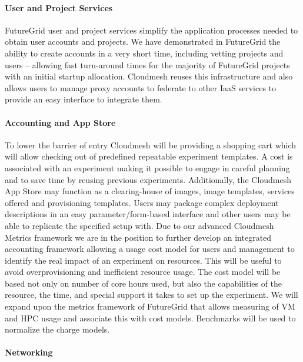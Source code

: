 \documentclass{tex/sig-alternate}
\begin{document}
\paragraph{User and Project Services}


FutureGrid user and project services simplify the application processes needed to obtain user accounts and projects. We have demonstrated in FutureGrid the ability to create accounts in a very short time, including vetting projects and users -- allowing fast turn-around times for the majority of FutureGrid projects with an initial startup allocation. Cloudmesh reuses this infrastructure and also allows users to manage proxy accounts to federate to other IaaS services to provide an easy interface to integrate them.


\paragraph{Accounting and App Store}


To lower the barrier of entry Cloudmesh will be providing a shopping cart which will allow checking out of predefined repeatable experiment templates. A cost is associated with an experiment making it possible to engage in careful planning and to save time by reusing previous experiments. Additionally, the Cloudmesh App Store may function as a clearing-house of images, image templates, services offered and provisioning templates. Users may package complex deployment descriptions in an easy parameter/form-based interface and other users may be able to replicate the specified setup with.
Due to our advanced Cloudmesh Metrics framework we are in the position to further develop an integrated accounting framework allowing a usage cost model for users and management to identify the real impact of an experiment on resources. This will be useful to avoid overprovisioning and inefficient resource usage. The cost model will be based not only on number of core hours used, but also the capabilities of the resource, the time, and special support it takes to set up the experiment. We will expand upon the metrics framework of FutureGrid that allows measuring of VM and HPC usage and associate this with cost models. Benchmarks will be used to normalize the charge models.


\paragraph{Networking}
\end{document}
